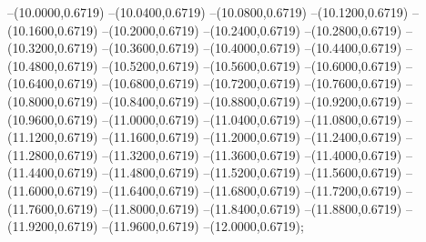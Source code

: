 {	--(10.0000,0.6719)
	--(10.0400,0.6719)
	--(10.0800,0.6719)
	--(10.1200,0.6719)
	--(10.1600,0.6719)
	--(10.2000,0.6719)
	--(10.2400,0.6719)
	--(10.2800,0.6719)
	--(10.3200,0.6719)
	--(10.3600,0.6719)
	--(10.4000,0.6719)
	--(10.4400,0.6719)
	--(10.4800,0.6719)
	--(10.5200,0.6719)
	--(10.5600,0.6719)
	--(10.6000,0.6719)
	--(10.6400,0.6719)
	--(10.6800,0.6719)
	--(10.7200,0.6719)
	--(10.7600,0.6719)
	--(10.8000,0.6719)
	--(10.8400,0.6719)
	--(10.8800,0.6719)
	--(10.9200,0.6719)
	--(10.9600,0.6719)
	--(11.0000,0.6719)
	--(11.0400,0.6719)
	--(11.0800,0.6719)
	--(11.1200,0.6719)
	--(11.1600,0.6719)
	--(11.2000,0.6719)
	--(11.2400,0.6719)
	--(11.2800,0.6719)
	--(11.3200,0.6719)
	--(11.3600,0.6719)
	--(11.4000,0.6719)
	--(11.4400,0.6719)
	--(11.4800,0.6719)
	--(11.5200,0.6719)
	--(11.5600,0.6719)
	--(11.6000,0.6719)
	--(11.6400,0.6719)
	--(11.6800,0.6719)
	--(11.7200,0.6719)
	--(11.7600,0.6719)
	--(11.8000,0.6719)
	--(11.8400,0.6719)
	--(11.8800,0.6719)
	--(11.9200,0.6719)
	--(11.9600,0.6719)
	--(12.0000,0.6719);
}
